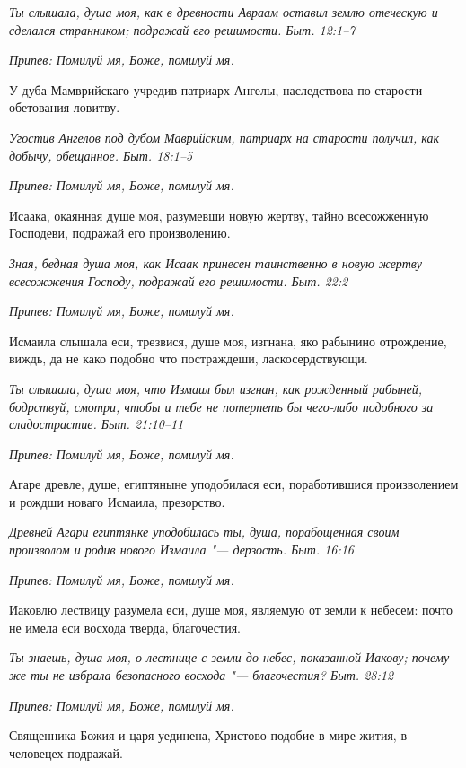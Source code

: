 \itshape Ты слышала, душа моя, как в древности Авраам оставил землю отеческую и сделался странником; подражай его решимости. Быт. 12:1–7\normalfont{}


\itshape Припев:\normalfont{} Помилуй мя, Боже, помилуй мя.


У дуба Мамврийскаго учредив патриарх Ангелы, наследствова по старости обетования ловитву.


\itshape Угостив Ангелов под дубом Маврийским, патриарх на старости получил, как добычу, обещанное. Быт. 18:1–5\normalfont{}


\itshape Припев:\normalfont{} Помилуй мя, Боже, помилуй мя.


Исаака, окаянная душе моя, разумевши новую жертву, тайно всесожженную Господеви, подражай его произволению.


\itshape Зная, бедная душа моя, как Исаак принесен таинственно в новую жертву всесожжения Господу, подражай его решимости. Быт. 22:2\normalfont{}


\itshape Припев:\normalfont{} Помилуй мя, Боже, помилуй мя.


Исмаила слышала еси, трезвися, душе моя, изгнана, яко рабынино отрождение, виждь, да не како подобно что постраждеши, ласкосердствующи.


\itshape Ты слышала, душа моя, что Измаил был изгнан, как рожденный рабыней, бодрствуй, смотри, чтобы и тебе не потерпеть бы чего-либо подобного за сладострастие. Быт. 21:10–11\normalfont{}


\itshape Припев:\normalfont{} Помилуй мя, Боже, помилуй мя.


Агаре древле, душе, египтяныне уподобилася еси, поработившися произволением и рождши новаго Исмаила, презорство.


\itshape Древней Агари египтянке уподобилась ты, душа, порабощенная своим произволом и родив нового Измаила "--- дерзость. Быт. 16:16\normalfont{}


\itshape Припев:\normalfont{} Помилуй мя, Боже, помилуй мя.


Иаковлю лествицу разумела еси, душе моя, являемую от земли к небесем: почто не имела еси восхода тверда, благочестия.


\itshape Ты знаешь, душа моя, о лестнице с земли до небес, показанной Иакову; почему же ты не избрала безопасного восхода "--- благочестия? Быт. 28:12\normalfont{}


\itshape Припев:\normalfont{} Помилуй мя, Боже, помилуй мя.


Священника Божия и царя уединена, Христово подобие в мире жития, в человецех подражай.


